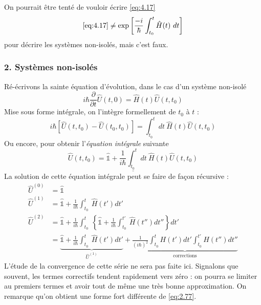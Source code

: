 		On pourrait être tenté de vouloir écrire \autoref{eq:4.17} 
		\begin{equation}
		\autoref{eq:4.17} \neq \exp\left[\dfrac{-i}{\hbar}\int_{t_0}^t \hat{H}(t)\ dt\right]
		\label{eq:2.77}
		\end{equation}
		pour décrire les systèmes non-isolés, mais c'est faux.
		
		\subsubsection{2. Systèmes non-isolés}
		Ré-écrivons la sainte équation d'évolution, dans le cas d'un système non-isolé
		\begin{equation}
		i\hbar\dfrac{\partial}{\partial t}\hat{U}(t,0) = \hat{H}(t)\hat{U}(t,t_0)
		\end{equation}
		Mise sous forme intégrale, on l'intègre formellement de $t_0$ à $t$ :
		\begin{equation}
		i\hbar\left[\hat{U}(t,t_0) - \hat{U}(t_0,t_0)\right] = \int_{t_0}^t dt\ \hat{H}(t)\hat{U}(t,t_0)
		\end{equation}
		Ou encore, pour obtenir l'\textit{équation intégrale} suivante
		\begin{equation}
		\underline{	\hat{U}(t,t_0) = \hat{\mathbb{1}} + \frac{1}{i\hbar}\int_{t_0}^t dt\ \hat{H}(t)\hat{U}(t,t_0)}
		\end{equation}
		La solution de cette équation intégrale peut se faire de façon récursive :
		\begin{equation}
		\begin{array}{ll}
		\hat{U}^{(0)} &= \hat{\mathbb{1}}\\
		\hat{U}^{(1)} &= \hat{\mathbb{1}} + \frac{1}{i\hbar}\int_{t_0}^t\ \hat{H}(t') dt'\\
		\hat{U}^{(2)} &= \hat{\mathbb{1}} + \frac{1}{i\hbar}\int_{t_0}^t\ \left\{ 
		\hat{\mathbb{1}} + \frac{1}{i\hbar}\int_{t_0}^{t'}\ \hat{H}(t'') dt''	\right\} dt'		\\
		&= \underbrace{\hat{\mathbb{1}} + \frac{1}{i\hbar}\int_{t_0}^t\ \hat{H}(t') dt'}_{\hat{U}^{(1)}} + 		
		\underbrace{\frac{1}{(i\hbar)^2}\int_{t_0}^t H(t')dt'\int_{t_0}^{t'} H(t'')dt''}_{\text{corrections}}
		\end{array}
		\end{equation}
		L'étude de la convergence de cette série ne sera pas faite ici. Signalons que souvent, les 
		termes correctifs tendent rapidement vers zéro : on pourra se limiter au premiers termes et 
		avoir tout de même une très bonne approximation. On remarque qu'on obtient une forme fort
		différente de \autoref{eq:2.77}.


